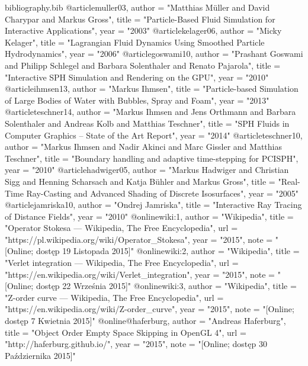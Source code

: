 \begin{filecontents}{bibliography.bib}
@article{muller03,
       author = "Matthias Müller and David Charypar and Markus Gross",
       title = "Particle-Based Fluid Simulation for Interactive Applications",
       year = "2003" }
@article{kelager06,
       author = "Micky Kelager",
       title = "Lagrangian Fluid Dynamics Using Smoothed Particle Hydrodynamics",
       year = "2006" }
@article{goswami10,
       author = "Prashant Goswami and Philipp Schlegel and Barbara Solenthaler and Renato Pajarola",
       title = "Interactive SPH Simulation and Rendering on the GPU",
       year = "2010" }
@article{ihmsen13,
       author = "Markus Ihmsen",
       title = "Particle-based Simulation of Large Bodies of Water with Bubbles, Spray and Foam",
       year = "2013" }
@article{teschner14,
       author = "Markus Ihmsen and Jens Orthmann and Barbara Solenthaler and Andreas Kolb and Matthias Teschner",
       title = "SPH Fluids in Computer Graphics -- State of the Art Report",
       year = "2014" }
@article{teschner10,
       author = "Markus Ihmsen and Nadir Akinci and Marc Gissler and Matthias Teschner",
       title = "Boundary handling and adaptive time-stepping for PCISPH",
       year = "2010" }
@article{hadwiger05,
       author = "Markus Hadwiger and Christian Sigg and Henning Scharsach and Katja Bühler and Markus Gross",
       title = "Real-Time Ray-Casting and Advanced Shading of Discrete Isosurfaces",
       year = "2005" }
@article{jamriska10,
       author = "Ondrej Jamriska",
       title = "Interactive Ray Tracing of Distance Fields",
       year = "2010" }
@online{wiki:1,
  author = "Wikipedia",
  title =  "Operator Stokesa --- {W}ikipedia{,} The Free Encyclopedia",
  url = "https://pl.wikipedia.org/wiki/Operator_Stokesa",
  year = "2015", 
  note = "[Online; dostęp 19 Listopada 2015]"}
@online{wiki:2,
  author = "Wikipedia",
  title =  "Verlet integration --- {W}ikipedia{,} The Free Encyclopedia",
  url = "https://en.wikipedia.org/wiki/Verlet_integration",
  year = "2015", 
  note = "[Online; dostęp 22 Września 2015]"}
@online{wiki:3,
  author = "Wikipedia",
  title =  "Z-order curve --- {W}ikipedia{,} The Free Encyclopedia",
  url = "https://en.wikipedia.org/wiki/Z-order_curve",
  year = "2015", 
  note = "[Online; dostęp 7 Kwietnia 2015]"}
@online{@haferburg,
  author = "Andreas Haferburg",
  title =  "Object Order Empty Space Skipping in OpenGL 4",
  url = "http://haferburg.github.io/",
  year = "2015", 
  note = "[Online; dostęp 30 Października 2015]"}

\end{filecontents}